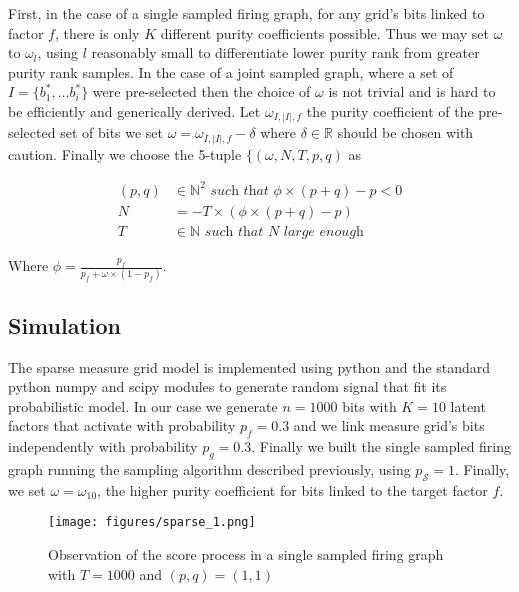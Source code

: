 \documentclass[a4paper, 11pt]{article}
\begin{document}
First, in the case of a single sampled firing graph, for any grid's bits linked to factor $f$, there is only $K$ different purity coefficients possible. Thus we may set $\omega$ to $\omega_l$, using $l$  reasonably small to differentiate lower purity rank from greater purity rank samples. In the case of a joint sampled graph, where a set of $I=\{b_1^{*}, \ldots b_i^{*}\}$ were pre-selected then the choice of $\omega$ is not trivial and is hard to be efficiently and generically derived. Let $\omega_{I, \vert I \vert, f}$ the purity coefficient of the pre-selected set of bits we set $\omega = \omega_{I, \vert I \vert, f} - \delta$ where $\delta \in \mathbb{R}$ should be chosen with caution. Finally we choose the 5-tuple $\lbrace (\omega, N, T, p, q)$ as 

\begin{align*}
(p, q) &\in \mathbb{N}^{2} \textit{ such that } \phi \times (p + q) - p < 0 \\
N &= -T \times (\phi \times (p+q) - p)\\
T &\in \mathbb{N} \textit{ such that } N \textit{ large enough}
\end{align*}


Where $\phi = \frac{p_f}{p_f + \omega \times (1-p_f)}$. 

\subsection{Simulation}

The sparse measure grid model is implemented using python and the standard python numpy and scipy modules to generate random signal that fit its probabilistic model. In our case we generate $n=1000$ bits with $K=10$ latent factors that activate with probability $p_f = 0.3$ and we link measure grid's bits independently with probability $p_g=0.3$. Finally we built the single sampled firing graph running the sampling algorithm described previously, using $p_{\mathcal{S}} = 1$. Finally, we set $\omega= \omega_{10}$, the higher purity coefficient for bits linked to the target factor $f$.

\begin{figure}[H]
\centering
\texttt{[image: figures/sparse\_1.png]}
\caption{Observation of the score process in a single sampled firing graph with $T=1000$ and $(p, q) = (1, 1)$}
\label{fig:sim_si_1}
\end{figure}
\end{document}
